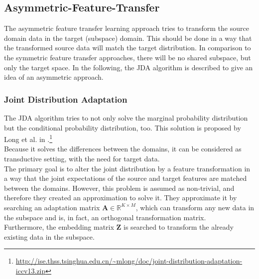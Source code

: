 \subsection{Asymmetric-Feature-Transfer}\label{TlSubSecHomoAsymFeature}
The asymmetric feature transfer learning approach tries to transform the source domain data in the target (subspace) domain.
This should be done in a way that the transformed source data will match the target distribution.
In comparison to the symmetric feature transfer approaches, there will be no shared subspace, but only the target space.
In the following, the \ac{JDA} algorithm is described to give an idea of an asymmetric approach.\cite[p. 6; 10]{Weiss.2016}
\subsubsection{Joint Distribution Adaptation}
The \acl{JDA} algorithm tries to not only solve the marginal probability distribution but the conditional probability distribution, too.
This solution is proposed by Long et al. in \cite{Long.}.\footnote{\url{http://ise.thss.tsinghua.edu.cn/~mlong/doc/joint-distribution-adaptation-iccv13.zip}}\\
Because it solves the differences between the domains, it can be considered as transductive setting, with the need for target data.\\
The primary goal is to alter the joint distribution by a feature transformation in a way that the joint expectations of the source and target features are matched between the domains.
However, this problem is assumed as non-trivial, and therefore they created an approximation to solve it.
They approximate it by searching an adaptation matrix $\mathbf{A} \in \mathbb{R}^{K\times M}$, which can transform any new data in the subspace and is, in fact, an orthogonal transformation matrix.\cite{Long.}\\
Furthermore, the embedding matrix $\mathbf{Z}$ is searched to transform the already existing data in the subspace.

